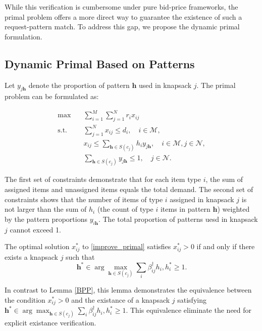 While this verification is cumbersome under pure bid-price frameworks, the primal problem offers a more direct way to guarantee the existence of such a request-pattern match. To address this gap, we propose the dynamic primal formulation.

\subsection{Dynamic Primal Based on Patterns}

Let $y_{j \bm{h}}$ denote the proportion of pattern $\bm{h}$ used in knapsack $j$. The primal problem can be formulated as:

\begin{equation}\label{improve_primal}
    \begin{aligned}
    \max \quad & \sum_{i=1}^M \sum_{j=1}^N r_i x_{i j} \\
    \text {s.t.} \quad & \sum_{j=1}^N x_{i j} \leq d_i, \quad i \in \mathcal{M}, \\
    & x_{i j} \leq \sum_{\bm{h} \in S(c_{j})} h_i y_{j \bm{h}}, \quad i \in \mathcal{M}, j \in \mathcal{N}, \\
    & \sum_{\bm{h} \in S(c_{j})} y_{j \bm{h}} \leq 1, \quad j \in \mathcal{N}.
    \end{aligned}
\end{equation}

The first set of constraints demonstrate that for each item type $i$, the sum of assigned items and unassigned items equals the total demand. The second set of constraints shows that the number of items of type $i$ assigned in knapsack $j$ is not larger than the sum of $h_{i}$ (the count of type $i$ items in pattern $\bm{h}$) weighted by the pattern proportions $y_{i \bm{h}}$. The total proportion of patterns uesd in knapsack $j$ cannot exceed 1.

\begin{lem}\label{primal}
The optimal solution $x_{ij}^{*}$ to \eqref{improve_primal} satisfies $x_{ij}^{*} > 0$ if and only if there exists a knapsack $j$ such that $$\bm{h}^{*} \in \arg\max_{\bm{h} \in S(c_j)} \sum_{i} \beta_{ij}^{\dag} h_{i}, h_{i}^{*} \geq 1.$$
\end{lem}

In contrast to Lemma \ref{BPP}, this lemma demonstrates the equivalence between the condition $x_{ij}^{*} > 0$ and the existance of a knapsack $j$ satisfying $\bm{h}^{*} \in \arg\max_{\bm{h} \in S(c_j)} \sum_{i} \beta_{ij}^{\dag} h_{i}, h_{i}^{*} \geq 1$. This equivalence eliminate the need for explicit existance verification.

